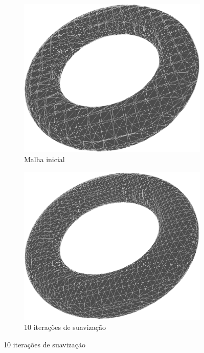 \documentclass[11pt]{article}
\begin{document}
		\begin{figure}
			\centering
			\begin{subfigure}[b]{0.45\textwidth}
				\centering
				\includegraphics[width=\textwidth]{figures/0iter_torus_mesh}
				\caption{Malha inicial}				
			\end{subfigure}
			\begin{subfigure}[b]{0.45\textwidth}
				\centering
				\includegraphics[width=\textwidth]{figures/10iter_torus_mesh}
				\caption{10 iterações de suavização}				
			\end{subfigure}

\end{figure}
\end{document}

